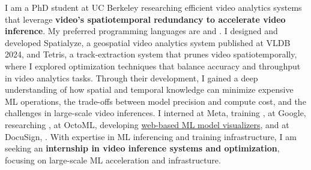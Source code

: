 \cvsummarysection


\begin{cvparagraph}

I am a PhD student at UC Berkeley researching efficient video analytics systems that leverage {\bf video's spatiotemporal redundancy to accelerate video inference}.
My preferred programming languages are \underline{} and \underline{}.
I designed and developed Spatialyze, a geospatial video analytics system published at VLDB 2024, and Tetris, a track-extraction system that prunes video spatiotemporally, where I explored optimization techniques that balance accuracy and throughput in video analytics tasks.
Through their development, I gained a deep understanding of how spatial and temporal knowledge can minimize expensive ML operations, the trade-offs between model precision and compute cost, and the challenges in large-scale video inferences.
I interned
at Meta, training \underline{},
at Google, researching \underline{},
at OctoML, developing \underline{web-based ML model visualizers},
and at DocuSign, \underline{}.
With expertise in ML inferencing and training infrastructure, I am seeking an {\bf internship in video inference systems and optimization}, focusing on large-scale ML acceleration and infrastructure.
\end{cvparagraph}
\vspace{-1mm}
